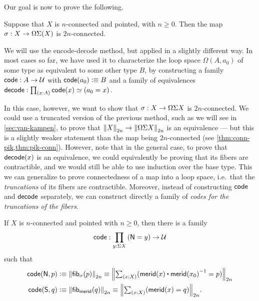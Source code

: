 Our goal is now to prove the following.

\begin{thm}\label{thm:freudenthal}
  Suppose that $X$ is $n$-connected and pointed, with $n\geq 0$.
  Then the map $\sigma:X\to \Omega\susp(X)$ is $2n$-connected.
\end{thm}

%

We will use the encode-decode method, but applied in a slightly different way.
In most cases so far, we have used it to characterize the loop space $\Omega (A,a_0)$ of some type as equivalent to some other type $B$, by constructing a family $\code:A\to \type$ with $\code(a_0)\defeq B$ and a family of equivalences $\decode:\prd{x:A}\code(x) \eqvsym (a_0=x)$.

In this case, however, we want to show that $\sigma:X\to \Omega \susp X$ is $2n$-connected.
We could use a truncated version of the previous method, such as we will see in \cref{sec:van-kampen}, to prove that $\trunc{2n}X\to \trunc{2n}{\Omega \susp X}$ is an equivalence --- but this is a slightly weaker statement than the map being $2n$-connected (see \cref{thm:conn-pik,thm:pik-conn}).
However, note that in the general case, to prove that $\decode(x)$ is an equivalence, we could equivalently be proving that its fibers are contractible, and we would still be able to use induction over the base type.
This we can generalize to prove connectedness of a map into a loop space, i.e.\ that the \emph{truncations} of its fibers are contractible.
Moreover, instead of constructing $\code$ and $\decode$ separately, we can construct directly a family of \emph{codes for the truncations of the fibers}.

\begin{defn}\label{thm:freudcode}
  If $X$ is $n$-connected and pointed with $n\geq 0$, then there is a family
  \begin{equation}
    \code:\prd{y:\susp X} (\north=y) \to \type\label{eq:freudcode}
  \end{equation}
  such that
  \begin{align}
    \code(\north,p) &\defeq \trunc{2n}{\hfib{\sigma}{p}}
    \jdeq \trunc{2n}{\tsm{x:X} (\merid(x) \ct \opp{\merid(x_0)} = p)}\label{eq:freudcodeN}\\
    \code(\south,q) &\defeq \trunc{2n}{\hfib{\merid}{q}}
    \jdeq \trunc{2n}{\tsm{x:X} (\merid(x) = q)}.\label{eq:freudcodeS}
  \end{align}
\end{defn}

